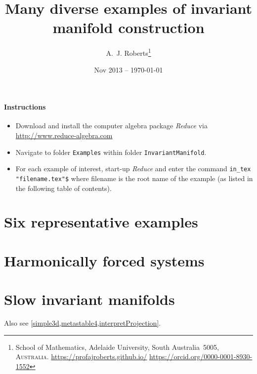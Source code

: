\documentclass[11pt,a4paper]{refart}
\title{Many diverse examples of invariant manifold construction}
\author{A.~J. Roberts\thanks{School of Mathematics, Adelaide University, South Australia~5005, \textsc{Australia}.
\url{https://profajroberts.github.io/}  
\url{https://orcid.org/0000-0001-8930-1552}}}
\date{Nov 2013 -- \today}
\newcounter{i}
\begin{document}
\maketitle


\paragraph{Instructions}
\begin{itemize}
\item Download and install the computer algebra package
\emph{Reduce} via \url{http://www.reduce-algebra.com}

\item Navigate to folder \verb|Examples| within folder \verb|InvariantManifold|.

\item For each example of interest, start-up \emph{Reduce} and enter the command \verb|in_tex "filename.tex"$|  where filename is the root name of the example (as listed in the following table of contents).

\end{itemize}


\tableofcontents




\section{Six representative examples}
\localtableofcontents











\section{Harmonically forced systems}
\localtableofcontents








\section{Slow invariant manifolds}
\localtableofcontents

Also see \cref{simple3d,metastable4,interpretProjection}.



\end{document}
